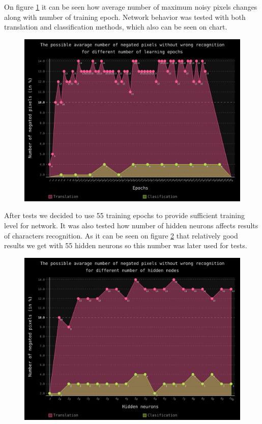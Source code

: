 \documentclass[a4paper]{article}
\begin{document}
On figure \ref{epochs} it can be seen how average number of maximum noisy pixels changes along with number of training epoch. Network behavior was tested with both translation and classification methods, which also can be seen on chart.
\begin{figure}[ht]
	\centering
	\includegraphics[scale=0.7,keepaspectratio=true]{Charts/epochsChart.png}	
	\caption{}
	\label{epochs}
\end{figure}
After tests we decided to use 55 training epochs to provide sufficient training level for network.
It was also tested how number of hidden neurons affects results of characters recognition.
As it can be seen on figure \ref{hidden} that relatively good results we get with 55 hidden neurons so this number was later used for tests.
\begin{figure}[ht]
	\centering
	\includegraphics[scale=0.7,keepaspectratio=true]{Charts/hiddenChart.png}	
	\caption{}
	\label{hidden}
\end{figure} 
\end{document}
